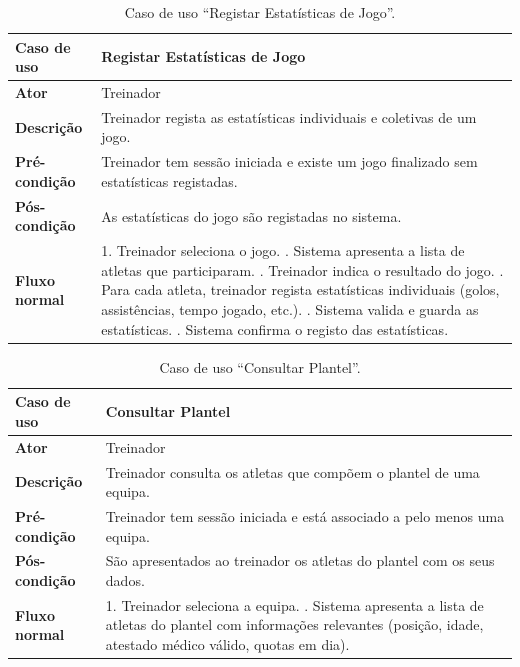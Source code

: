 \begin{table}[H]
\centering
\begin{tabularx}{\textwidth}{|l|X|}
\hline
\textbf{Caso de uso} & Registar Estatísticas de Jogo \\
\hline
\textbf{Ator} & Treinador \\
\hline
\textbf{Descrição} & Treinador regista as estatísticas individuais e coletivas de um jogo. \\
\hline
\textbf{Pré-condição} & Treinador tem sessão iniciada e existe um jogo finalizado sem estatísticas registadas. \\
\hline
\textbf{Pós-condição} & As estatísticas do jogo são registadas no sistema. \\
\hline
\textbf{Fluxo normal} & 
1. Treinador seleciona o jogo. \newline
2. Sistema apresenta a lista de atletas que participaram. \newline
3. Treinador indica o resultado do jogo. \newline
4. Para cada atleta, treinador regista estatísticas individuais (golos, assistências, tempo jogado, etc.). \newline
5. Sistema valida e guarda as estatísticas. \newline
6. Sistema confirma o registo das estatísticas. \\
\hline
\end{tabularx}
\caption{Caso de uso ``Registar Estatísticas de Jogo''.}
\label{tab:uc_registar_estatisticas}
\end{table}

\begin{table}[H]
\centering
\begin{tabularx}{\textwidth}{|l|X|}
\hline
\textbf{Caso de uso} & Consultar Plantel \\
\hline
\textbf{Ator} & Treinador \\
\hline
\textbf{Descrição} & Treinador consulta os atletas que compõem o plantel de uma equipa. \\
\hline
\textbf{Pré-condição} & Treinador tem sessão iniciada e está associado a pelo menos uma equipa. \\
\hline
\textbf{Pós-condição} & São apresentados ao treinador os atletas do plantel com os seus dados. \\
\hline
\textbf{Fluxo normal} & 
1. Treinador seleciona a equipa. \newline
2. Sistema apresenta a lista de atletas do plantel com informações relevantes (posição, idade, atestado médico válido, quotas em dia). \\
\hline
\end{tabularx}
\caption{Caso de uso ``Consultar Plantel''.}
\label{tab:uc_consultar_plantel}
\end{table}

